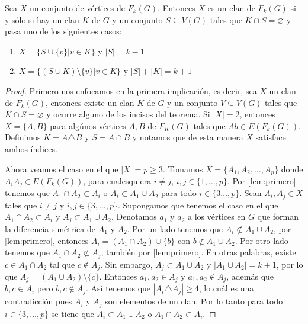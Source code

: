     \begin{teorema}
        \label{teo:cuarto}
        Sea $X$ un conjunto de v\'ertices de $F_k(G)$. Entonces $X$ es un clan
        de $F_k(G)$ si y s\'olo si hay un clan $K$ de $G$ y un conjunto $S
        \subseteq V(G)$ tales que $K \cap S = \varnothing$ y pasa uno de los
        siguientes casos:
        \begin{enumerate}
            \item $X = \{S \cup \{v\}| v \in K\}$ y $|S| = k-1$
            \item $X = \{(S\cup K) \setminus \{v\}| v \in K \}$ y $|S| + |K| =
            k+1$
        \end{enumerate}
    \end{teorema}

    \begin{proof}
        Primero nos enfocamos en la primera implicaci\'on, es decir, sea $X$ un
        clan de $F_k(G)$, entonces existe un clan $K$ de $G$ y un conjunto $V
        \subseteq V(G)$ tales que $K \cap S = \varnothing$ y ocurre alguno de
        los incisos del teorema. Si $|X|=2$, entonces $X= \{A, B\}$ para
        alg\'unos v\'ertices $A, B$ de $F_K(G)$ tales que $Ab \in E(F_k(G))$.
        Definimos $K = A \triangle B$ y $S=A \cap B$ y notamos que de esta
        manera $X$ satisface ambos \'indices.

        Ahora veamos el caso en el que $|X|= p \geq 3$. Tomamos $X=\{A_1, A_2,
        \dots, A_p\}$ donde $A_iA_j \in E(F_k(G))$, para cualesquiera $i\neq j$,
        $i,j \in \{1, \dots, p\}$. Por \cref*{lem:primero} tenemos que $A_1\cap
        A_2 \subset A_i$ o $A_i \subset A_1 \cup A_2$ para todo $i \in \{3
        \dots,p \}$. Sean $A_i, A_j \in X$ tales que $i \neq j$ y $i, j \in \{3,
        \dots, p\}$. Supongamos que tenemos el caso en el que $A_1\cap A_2
        \subset A_i$ y $A_j \subset A_1 \cup A_2$. Denotamos $a_1$ y $a_2$ a los
        v\'ertices en $G$ que forman la diferencia sim\'etrica de $A_1$ y $A_2$.
        Por un lado tenemos que $A_i \not\subset A_1\cup A_2$, por
        \cref*{lem:primero}, entonces $A_i = (A_1\cap A_2) \cup \{b\}$ con $b
        \notin A_1\cup A_2$. Por otro lado tenemos que $A_1 \cap A_2 \not\subset
        A_j$, tambi\'en por \cref*{lem:primero}. En otras palabras, existe $c
        \in A_1 \cap A_2$ tal que $c \notin A_j$. Sin embargo, $A_j \subset A_1
        \cup A_2$ y $|A_1 \cup A_2| =k+1$, por lo que $A_j = (A_1 \cup
        A_2)\setminus \{c\}$. Entonces $a_1, a_2 \in A_j$ y $a_1, a_2 \notin
        A_j$, adem\'as que $b, c \in A_i$ pero $b, c \notin A_j$. As\'i tenemos
        que $|A_i \triangle A_j| \geq 4$, lo cu\'al es una contradicci\'on pues
        $A_i$ y $A_j$ son elementos de un clan. Por lo tanto para todo $i\in
        \{3, \dots, p\}$ se tiene que $A_i \subset A_1\cup A_2$ o $A_1 \cap A_2
        \subset A_i$.


\end{proof}
